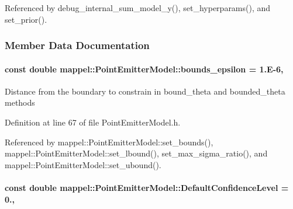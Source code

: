 Referenced by debug\+\_\+internal\+\_\+sum\+\_\+model\+\_\+y(), set\+\_\+hyperparams(), and set\+\_\+prior().



\subsubsection{Member Data Documentation}
\paragraph[{\texorpdfstring{bounds\+\_\+epsilon}{bounds_epsilon}}]{\setlength{\rightskip}{0pt plus 5cm}const double mappel\+::\+Point\+Emitter\+Model\+::bounds\+\_\+epsilon = 1.\+E-\/6\hspace{0.3cm}{\ttfamily [static]}, {\ttfamily [inherited]}}\hypertarget{classmappel_1_1PointEmitterModel_ac987a119137b85a27704b1c40e3fab8c}{}\label{classmappel_1_1PointEmitterModel_ac987a119137b85a27704b1c40e3fab8c}
Distance from the boundary to constrain in bound\+\_\+theta and bounded\+\_\+theta methods 

Definition at line 67 of file Point\+Emitter\+Model.\+h.



Referenced by mappel\+::\+Point\+Emitter\+Model\+::set\+\_\+bounds(), mappel\+::\+Point\+Emitter\+Model\+::set\+\_\+lbound(), set\+\_\+max\+\_\+sigma\+\_\+ratio(), and mappel\+::\+Point\+Emitter\+Model\+::set\+\_\+ubound().

\paragraph[{\texorpdfstring{Default\+Confidence\+Level}{DefaultConfidenceLevel}}]{\setlength{\rightskip}{0pt plus 5cm}const double mappel\+::\+Point\+Emitter\+Model\+::\+Default\+Confidence\+Level = 0.\hspace{0.3cm}{\ttfamily [static]}, {\ttfamily [inherited]}}\hypertarget{classmappel_1_1PointEmitterModel_ac57f7550589dcdbf3b6281e91d3e24ff}{}\label{classmappel_1_1PointEmitterModel_ac57f7550589dcdbf3b6281e91d3e24ff}


